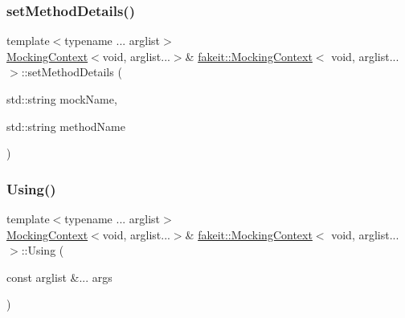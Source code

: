 \subsubsection{\texorpdfstring{setMethodDetails()}{setMethodDetails()}\hspace{0.1cm}{\footnotesize\ttfamily [9/9]}}
{\footnotesize\ttfamily template$<$typename ... arglist$>$ \\
\mbox{\hyperlink{classfakeit_1_1MockingContext}{Mocking\+Context}}$<$void, arglist...$>$\& \mbox{\hyperlink{classfakeit_1_1MockingContext}{fakeit\+::\+Mocking\+Context}}$<$ void, arglist... $>$\+::set\+Method\+Details (\begin{DoxyParamCaption}\item[{std\+::string}]{mock\+Name,  }\item[{std\+::string}]{method\+Name }\end{DoxyParamCaption})\hspace{0.3cm}{\ttfamily [inline]}}

\mbox{\label{classfakeit_1_1MockingContext_3_01void_00_01arglist_8_8_8_01_4_a0dad4e59214a5fdcacad0e4a170df071}} 
\subsubsection{\texorpdfstring{Using()}{Using()}\hspace{0.1cm}{\footnotesize\ttfamily [1/18]}}
{\footnotesize\ttfamily template$<$typename ... arglist$>$ \\
\mbox{\hyperlink{classfakeit_1_1MockingContext}{Mocking\+Context}}$<$void, arglist...$>$\& \mbox{\hyperlink{classfakeit_1_1MockingContext}{fakeit\+::\+Mocking\+Context}}$<$ void, arglist... $>$\+::Using (\begin{DoxyParamCaption}\item[{const arglist \&...}]{args }\end{DoxyParamCaption})\hspace{0.3cm}{\ttfamily [inline]}}

\mbox{\label{classfakeit_1_1MockingContext_3_01void_00_01arglist_8_8_8_01_4_aaab0ad3883ab87bd3885671e3266546e}} 
